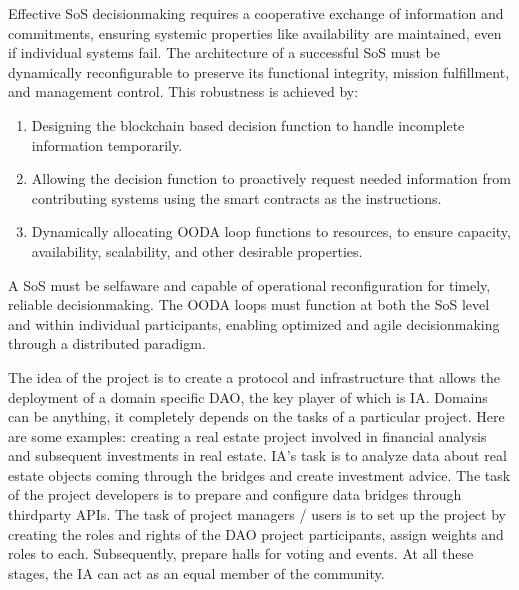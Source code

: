 \documentclass[a4paper,12pt,english]{sphinxmanual}
\begin{document}
\sphinxAtStartPar
Effective SoS decision\sphinxhyphen{}making requires a cooperative exchange of information and
commitments, ensuring systemic properties like availability are maintained, even
if individual systems fail. The architecture of a successful SoS must be dynamically
reconfigurable to preserve its functional integrity, mission
fulfillment, and management control. This robustness is achieved by:
\begin{enumerate}
%
\item {} 
\sphinxAtStartPar
Designing the blockchain based decision function to handle incomplete
information temporarily.

\item {} 
\sphinxAtStartPar
Allowing the decision function to proactively request needed
information from contributing systems using the smart contracts as
the instructions.

\item {} 
\sphinxAtStartPar
Dynamically allocating OODA loop functions to resources, to ensure
capacity, availability, scalability, and other desirable properties.

\end{enumerate}

\sphinxAtStartPar
A SoS must be self\sphinxhyphen{}aware and capable of operational reconfiguration for
timely, reliable decision\sphinxhyphen{}making. The OODA loops must function at both
the SoS level and within individual participants, enabling optimized and
agile decision\sphinxhyphen{}making through a distributed paradigm.

\sphinxAtStartPar
The idea of the project is to create a protocol and infrastructure
that allows the deployment of a domain specific DAO, the key player of
which is IA. Domains can be anything, it completely depends on the tasks
of a particular project. Here are some examples: creating a real estate
project involved in financial analysis and subsequent investments in
real estate. IA’s task is to analyze data about real estate objects
coming through the bridges and create investment advice. The task of the
project developers is to prepare and configure data bridges through
third\sphinxhyphen{}party APIs. The task of project managers / users is to set up the
project by creating the roles and rights of the DAO project
participants, assign weights and roles to each. Subsequently, prepare
halls for voting and events. At all these stages, the IA can act as an
equal member of the community.
\end{document}
